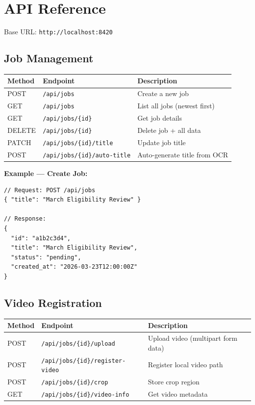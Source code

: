 \documentclass[12pt, a4paper]{article}
\newcommand{\codeinline}[1]{\texttt{\small\colorbox{codebg}{#1}}}
\begin{document}
\section{API Reference}

Base URL: \codeinline{http://localhost:8420}

\subsection{Job Management}

\begin{tabularx}{\textwidth}{@{} l l X @{}}
    \toprule
    \textbf{Method} & \textbf{Endpoint} & \textbf{Description} \\
    \midrule
    POST & \codeinline{/api/jobs} & Create a new job \\
    GET & \codeinline{/api/jobs} & List all jobs (newest first) \\
    GET & \codeinline{/api/jobs/\{id\}} & Get job details \\
    DELETE & \codeinline{/api/jobs/\{id\}} & Delete job + all data \\
    PATCH & \codeinline{/api/jobs/\{id\}/title} & Update job title \\
    POST & \codeinline{/api/jobs/\{id\}/auto-title} & Auto-generate title from OCR \\
    \bottomrule
\end{tabularx}

\vspace{0.5cm}

\textbf{Example --- Create Job:}
\begin{lstlisting}[style=json]
// Request: POST /api/jobs
{ "title": "March Eligibility Review" }

// Response:
{
  "id": "a1b2c3d4",
  "title": "March Eligibility Review",
  "status": "pending",
  "created_at": "2026-03-23T12:00:00Z"
}
\end{lstlisting}

\subsection{Video Registration}

\begin{tabularx}{\textwidth}{@{} l l X @{}}
    \toprule
    \textbf{Method} & \textbf{Endpoint} & \textbf{Description} \\
    \midrule
    POST & \codeinline{/api/jobs/\{id\}/upload} & Upload video (multipart form data) \\
    POST & \codeinline{/api/jobs/\{id\}/register-video} & Register local video path \\
    POST & \codeinline{/api/jobs/\{id\}/crop} & Store crop region \\
    GET & \codeinline{/api/jobs/\{id\}/video-info} & Get video metadata \\
    \bottomrule
\end{tabularx}
\end{document}
